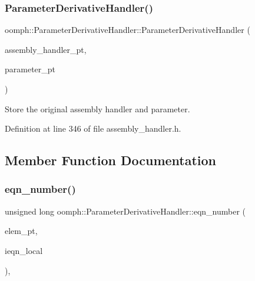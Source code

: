 \subsubsection{\texorpdfstring{Parameter\+Derivative\+Handler()}{ParameterDerivativeHandler()}}
{\footnotesize\ttfamily oomph\+::\+Parameter\+Derivative\+Handler\+::\+Parameter\+Derivative\+Handler (\begin{DoxyParamCaption}\item[{\hyperlink{classoomph_1_1AssemblyHandler}{Assembly\+Handler} $\ast$const \&}]{assembly\+\_\+handler\+\_\+pt,  }\item[{double $\ast$const \&}]{parameter\+\_\+pt }\end{DoxyParamCaption})\hspace{0.3cm}{\ttfamily [inline]}}



Store the original assembly handler and parameter. 



Definition at line 346 of file assembly\+\_\+handler.\+h.



\subsection{Member Function Documentation}
\mbox{\label{classoomph_1_1ParameterDerivativeHandler_a359b3b627532773b4606db1989f9c844}} 
\subsubsection{\texorpdfstring{eqn\+\_\+number()}{eqn\_number()}}
{\footnotesize\ttfamily unsigned long oomph\+::\+Parameter\+Derivative\+Handler\+::eqn\+\_\+number (\begin{DoxyParamCaption}\item[{\hyperlink{classoomph_1_1GeneralisedElement}{Generalised\+Element} $\ast$const \&}]{elem\+\_\+pt,  }\item[{const unsigned \&}]{ieqn\+\_\+local }\end{DoxyParamCaption})\hspace{0.3cm}{\ttfamily [inline]}, {\ttfamily [virtual]}}



